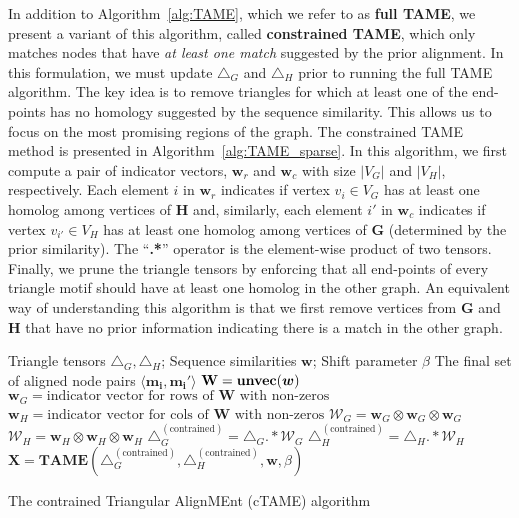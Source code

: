 \documentclass[10pt, journal, compsoc, final]{IEEEtran}
\newcommand{\bs}[1]{\boldsymbol{#1}}
\newcommand{\Vector}[1]{\bs{#1}}
\newcommand{\Matrix}[1]{\mathbf{#1}}
\newcommand{\Tensor}[1]{\mathbf{\mathcal{#1}}}
\newcommand{\Graph}[1]{\mathit{\mathbf{\bs{#1}}}}
\newcommand{\Set}[1]{\mathit{#1}}
\begin{document}
In addition to Algorithm~\ref{alg:TAME}, which we refer to as \textbf{full TAME}, we present a 
variant of this algorithm, called \textbf{constrained TAME}, which only matches nodes that 
have \emph{at least one match} suggested by the prior alignment. In this formulation, we 
must update $\Tensor{\bigtriangleup}_G$ and $\Tensor{\bigtriangleup}_H$ prior to running the 
full TAME algorithm. The key idea is to remove triangles for which at least one of the end-points
has no homology suggested by the sequence similarity.
This allows us to focus on the most promising regions of the graph. The constrained TAME method
is presented in Algorithm~\ref{alg:TAME_sparse}. In this algorithm, we first compute a pair
of indicator vectors, 
$\Vector{w}_r$ and $\Vector{w}_c$ with size $|\Set{V}_G|$ and $|\Set{V}_H|$, 
respectively. Each element $i$ in $\Vector{w}_r$ indicates if vertex $v_i \in \Set{V}_G$ has at least 
one homolog among vertices of $\Graph{H}$ and, similarly, each element $i'$ in $\Vector{w}_c$ 
indicates if vertex $v_{i'} \in \Set{V}_H$ has at least one homolog among vertices of $\Graph{G}$ (determined
by the prior similarity). The 
``\textbf{.*}'' operator is the element-wise product of two tensors. Finally, we prune the triangle 
tensors by enforcing that all end-points of every triangle motif should have at least one homolog 
in the other graph. An equivalent way of understanding this algorithm is that we first remove
vertices from $\Graph{G}$ and $\Graph{H}$ that have no prior information indicating there is
a match in the other graph. 


\begin{algorithm}
\centering
\begin{algorithmic}[1]
\REQUIRE Triangle tensors $\Tensor{\bigtriangleup}_G, \Tensor{\bigtriangleup}_H$;   Sequence similarities $\Vector{w}$; Shift parameter $\beta$
\ENSURE The final set of aligned node pairs $\langle \Vector{m_i}, \Vector{m_i'} \rangle$
\STATE $\Matrix{W} = \text{\textbf{unvec}}(\Vector{w})$
\STATE $\Vector{w}_G = \text{indicator vector for rows of $\Matrix{W}$ with non-zeros}$
\STATE $\Vector{w}_H = \text{indicator vector for cols of $\Matrix{W}$ with non-zeros}$
\STATE $\Tensor{W}_G = \Vector{w}_G \otimes \Vector{w}_G \otimes \Vector{w}_G$
\STATE $\Tensor{W}_H = \Vector{w}_H \otimes \Vector{w}_H \otimes \Vector{w}_H$
\STATE $\Tensor{\bigtriangleup}_G^{(\text{contrained})} = \Tensor{\bigtriangleup}_G .* \Tensor{W}_G$
\STATE $\Tensor{\bigtriangleup}_H^{(\text{contrained})} = \Tensor{\bigtriangleup}_H .* \Tensor{W}_H$
\STATE $\Matrix{X} = \textbf{TAME}(\Tensor{\bigtriangleup}_G^{(\text{contrained})}, \Tensor{\bigtriangleup}_H^{(\text{contrained})}, \Vector{w}, \beta)$
\end{algorithmic}
\caption{The contrained Triangular AlignMEnt (cTAME) algorithm}
\label{alg:TAME_sparse}
\end{algorithm}
\end{document}
